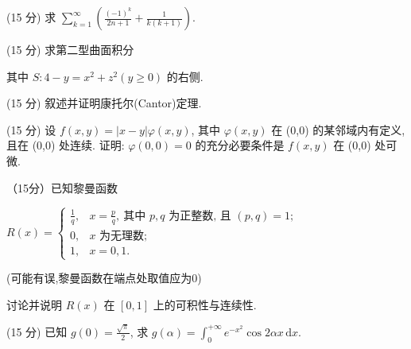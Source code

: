 (15 分) 求 $\sum_{k=1}^{\infty}\left(\frac{(-1)^k}{2n+1}+\frac{1}{k(k+1)}\right)$.\par
\par{}
\par{}
(15 分) 求第二型曲面积分\par
\nopagebreak[4]
其中 $S: 4 - y = x^{2} + z^{2} (y \geq 0)$ 的右侧.\par
\par{}
(15 分) 叙述并证明康托尔(Cantor)定理.\par
\par{}
(15 分) 设 $f(x, y) = |x - y| \varphi(x, y)$, 其中 $\varphi(x, y)$ 在 (0,0) 的某邻域内有定义, 且在 (0,0) 处连续. 证明: $\varphi(0,0) = 0$ 的充分必要条件是 $f(x, y)$ 在 (0,0) 处可微.\par
\par{}
（15分）已知黎曼函数\par
$R(x)=\begin{cases}\frac{1}{q},&x=\frac{p}{q},\ \text{其中 }p,q\text{ 为正整数, 且 }(p,q)=1;\\0,&x\text{ 为无理数};\\1,&x=0,1.\end{cases}$\par (可能有误,黎曼函数在端点处取值应为0)\par
讨论并说明  $R(x)$  在  $[0,1]$  上的可积性与连续性.\par
\par{}
(15 分) 已知 $g(0) = \frac{\sqrt{\pi}}{2}$, 求 $g(\alpha) = \int_{0}^{+\infty} e^{-x^2} \cos 2\alpha x \, \mathrm{d}x$.\par
